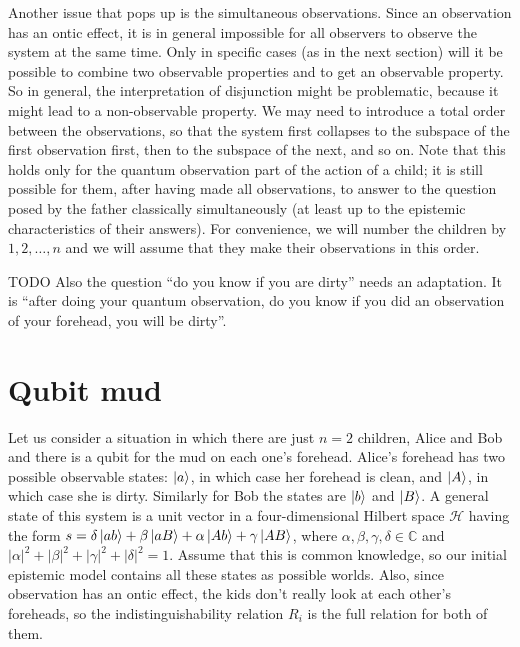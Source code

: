 \documentclass[a4paper]{article}
\newcommand{\HH}{\mathcal{H}}
\begin{document}
Another issue that pops up is the simultaneous observations. Since an
observation has an ontic effect, it is in general impossible for all observers
to observe the system at the same time. Only in specific cases (as in the next
section) will it be possible to combine two observable properties and to get an
observable property. So in general, the interpretation of disjunction might be
problematic, because it might lead to a non-observable property. We may need to
introduce a total order between the observations, so that the system first
collapses to the subspace of the first observation first, then to the subspace
of the next, and so on. Note that this holds only for the quantum observation
part of the action of a child; it is still possible for them, after having made
all observations, to answer to the question posed by the father classically
simultaneously (at least up to the epistemic characteristics of their answers).
For convenience, we will number the children by $1, 2, \dots, n$ and we will
assume that they make their observations in this order.

TODO
Also the question ``do you know if you are dirty'' needs an adaptation. It is 
``after doing your quantum observation, do you know if you did an observation of
your forehead, you will be dirty''.

\section*{Qubit mud}
Let us consider a situation in which there are just $n = 2$ children, Alice and
Bob and there is a qubit for the mud on each one's forehead. Alice's forehead
has two possible observable states: $\ket{a}$, in which case her forehead is
clean, and $\ket{A}$, in which case she is dirty. Similarly for Bob the states
are $\ket{b}$ and $\ket{B}$. A general state of this system is a unit vector in
a four-dimensional Hilbert space $\HH$ having the form $s = \delta \ket{ab} +
\beta \ket{aB} + \alpha \ket{Ab} + \gamma \ket{AB}$, where $\alpha, \beta,
\gamma, \delta \in \mathbb{C}$ and $|\alpha|^2 + |\beta|^2 + |\gamma|^2 +
|\delta|^2 = 1$.  Assume that this is common knowledge, so our initial epistemic
model contains all these states as possible worlds.  Also, since observation has
an ontic effect, the kids don't really look at each other's foreheads, so the
indistinguishability relation $R_i$ is the full relation for both of them.
\end{document}
